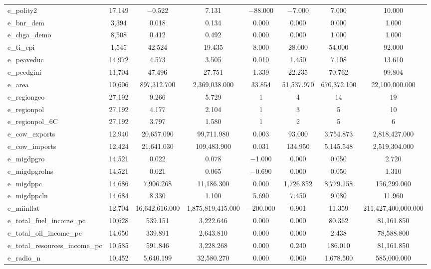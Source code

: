 \begin{table}[!htbp]
\begin{tabular}{@{\extracolsep{5pt}}lccccccc}
e\_polity2 & 17,149 & $-$0.522 & 7.131 & $-$88.000 & $-$7.000 & 7.000 & 10.000 \\ 
e\_bnr\_dem & 3,394 & 0.018 & 0.134 & 0.000 & 0.000 & 0.000 & 1.000 \\ 
e\_chga\_demo & 8,508 & 0.412 & 0.492 & 0.000 & 0.000 & 1.000 & 1.000 \\ 
e\_ti\_cpi & 1,545 & 42.524 & 19.435 & 8.000 & 28.000 & 54.000 & 92.000 \\ 
e\_peaveduc & 14,972 & 4.573 & 3.505 & 0.010 & 1.450 & 7.108 & 13.610 \\ 
e\_peedgini & 11,704 & 47.496 & 27.751 & 1.339 & 22.235 & 70.762 & 99.804 \\ 
e\_area & 10,606 & 897,312.700 & 2,369,038.000 & 33.854 & 51,537.970 & 670,372.100 & 22,100,000.000 \\ 
e\_regiongeo & 27,192 & 9.266 & 5.729 & 1 & 4 & 14 & 19 \\ 
e\_regionpol & 27,192 & 4.177 & 2.104 & 1 & 3 & 5 & 10 \\ 
e\_regionpol\_6C & 27,192 & 3.797 & 1.580 & 1 & 2 & 5 & 6 \\ 
e\_cow\_exports & 12,940 & 20,657.090 & 99,711.980 & 0.003 & 93.000 & 3,754.873 & 2,818,427.000 \\ 
e\_cow\_imports & 12,424 & 21,641.030 & 109,483.900 & 0.031 & 134.950 & 5,145.548 & 2,519,304.000 \\ 
e\_migdpgro & 14,521 & 0.022 & 0.078 & $-$1.000 & 0.000 & 0.050 & 2.720 \\ 
e\_migdpgrolns & 14,521 & 0.021 & 0.065 & $-$0.690 & 0.000 & 0.050 & 1.310 \\ 
e\_migdppc & 14,686 & 7,906.268 & 11,186.300 & 0.000 & 1,726.852 & 8,779.158 & 156,299.000 \\ 
e\_migdppcln & 14,684 & 8.330 & 1.100 & 5.690 & 7.450 & 9.080 & 11.960 \\ 
e\_miinflat & 12,704 & 16,642,616.000 & 1,875,819,415.000 & $-$200.000 & 0.901 & 11.359 & 211,427,400,000.000 \\ 
e\_total\_fuel\_income\_pc & 10,628 & 539.151 & 3,222.646 & 0.000 & 0.000 & 80.362 & 81,161.850 \\ 
e\_total\_oil\_income\_pc & 14,650 & 339.891 & 2,643.810 & 0.000 & 0.000 & 2.438 & 78,588.800 \\ 
e\_total\_resources\_income\_pc & 10,585 & 591.846 & 3,228.268 & 0.000 & 0.240 & 186.010 & 81,161.850 \\ 
e\_radio\_n & 10,452 & 5,640.199 & 32,580.270 & 0.000 & 0.000 & 1,678.500 & 585,000.000 \\ 

\end{tabular}
\end{table}
